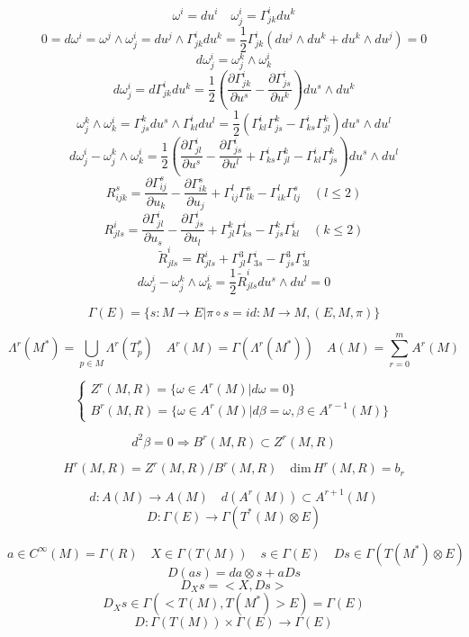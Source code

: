 \documentclass[12pt,a4paper]{article}
\begin{document}
\[
\omega^i = du^i \quad \omega^i_j = \Gamma^i_{jk}du^k
\]
\[
0= d\omega^i = \omega^j \wedge \omega^i_j = du^j \wedge \Gamma^i_{jk}du^k = \frac{1}{2}\Gamma^i_{jk}(du^j\wedge du^k + du^k \wedge du^j) = 0
\]
\[
d\omega^i_j = \omega^k_j \wedge \omega^i_k
\]
\[
d\omega^i_j = d\Gamma^i_{jk}du^k = \frac{1}{2}\left(\frac{\partial \Gamma^i_{jk}}{\partial u^s} - \frac{\partial \Gamma^i_{js}}{\partial u^k}\right)du^s \wedge du^k
\]
\[
\omega^k_j \wedge \omega^i_k = \Gamma^k_{js}du^s \wedge \Gamma^i_{kl}du^l = \frac{1}{2}\left( 
\Gamma^i_{kl}\Gamma^k_{js} - \Gamma^i_{ks}\Gamma^k_{jl}
\right) du^s \wedge du^l
\]
\[
d\omega^i_j - \omega^k_j \wedge \omega^i_k = \frac{1}{2}\left(
\frac{\partial \Gamma^i_{jl}}{\partial u^s} - \frac{\partial \Gamma^i_{js}}{\partial u^l} + \Gamma^i_{ks}\Gamma^k_{jl} - \Gamma^i_{kl}\Gamma^k_{js}
\right)du^s \wedge du^l
\]
\[
R^s_{ijk} = \frac{\partial\Gamma^s_{ij}}{\partial u_k} - \frac{\partial\Gamma^s_{ik}}{\partial u_j} + \Gamma^l_{ij}\Gamma^s_{lk} - \Gamma^l_{ik}\Gamma^s_{lj}
\quad (l \leq 2)
\]
\[
R^i_{jls} = \frac{\partial\Gamma^i_{jl}}{\partial u_s} - \frac{\partial\Gamma^i_{js}}{\partial u_l} + \Gamma^k_{jl}\Gamma^i_{ks} - \Gamma^k_{js}\Gamma^i_{kl}
\quad (k \leq 2)
\]
\[
\tilde{R}^i_{jls} = R^i_{jls} + \Gamma^3_{jl}\Gamma^i_{3s} - \Gamma^3_{js}\Gamma^i_{3l}
\]
\[
d\omega^i_j - \omega^k_j \wedge \omega^i_k = \frac{1}{2}\tilde{R}^i_{jls}du^s \wedge du^l =0
\]



\[
\Gamma (E) = \{s:M \rightarrow E| \pi \circ s = id: M \rightarrow M, (E,M,\pi)\}
\]

\[
\Lambda^r (M^*) = \bigcup_{p \in M} \Lambda^r( T_p^*) \quad A^r(M) = \Gamma(\Lambda^r (M^*)) \quad A(M) = \sum_{r = 0}^m A^r(M)
\]

\[
\begin{cases}
Z^r(M,R) = \{\omega \in A^r(M) | d\omega = 0\} \\
B^r(M,R) = \{\omega \in A^r(M) | d\beta = \omega, \beta \in A^{r-1}(M)\}
\end{cases}
\]

\[
d^2 \beta = 0 \Rightarrow B^r(M,R) \subset Z^r(M,R)
\]

\[
H^r(M,R) = Z^r(M,R) / B^r(M,R) \quad \mathrm{dim} \,H^r(M,R) = b_r
\]

\[
d: A(M) \rightarrow A(M) \quad d(A^r(M)) \subset A^{r+1}(M)
\]
\[
D: \Gamma(E) \rightarrow \Gamma(T^*(M)\otimes E) 
\]

\[
a \in C^{\infty} (M) = \Gamma(R) \quad X \in \Gamma(T(M)) \quad s \in \Gamma(E) \quad Ds \in \Gamma(T(M^*)\otimes E)
\]
\[
D(as) = da \otimes s + aDs
\]
\[
D_X s = <X,Ds>
\]
\[
D_X s \in \Gamma(<T(M),T(M^*)>E)=\Gamma(E)
\]
\[
D: \Gamma(T(M)) \times \Gamma(E) \rightarrow   \Gamma(E) 
\]
\end{document}
